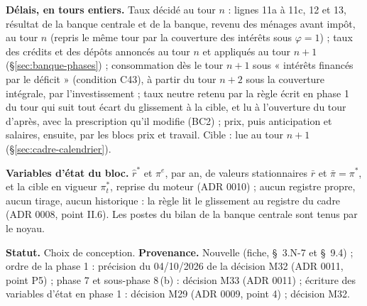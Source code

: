 \documentclass[11pt,a4paper]{article}
\begin{document}
\begin{proposee}
\textbf{Délais, en tours entiers.} Taux décidé au tour $n$ : lignes 11a à 11c, 12 et 13, résultat de la banque centrale et de la banque, revenu des ménages avant impôt, au tour $n$ (repris le même tour par la couverture des intérêts sous $\varphi = 1$) ; taux des crédits et des dépôts annoncés au tour $n$ et appliqués au tour $n + 1$ (\S\ref{sec:banque-phases}) ; consommation dès le tour $n + 1$ sous « intérêts financés par le déficit » (condition C43), à partir du tour $n + 2$ sous la couverture intégrale, par l'investissement ; taux neutre retenu par la règle écrit en phase 1 du tour qui suit tout écart du glissement à la cible, et lu à l'ouverture du tour d'après, avec la prescription qu'il modifie (BC2) ; prix, puis anticipation et salaires, ensuite, par les blocs prix et travail. Cible : lue au tour $n + 1$ (\S\ref{sec:cadre-calendrier}).

\textbf{Variables d'état du bloc.} $\hat r^\ast$ et $\pi^e$, par an, de valeurs stationnaires $\bar r$ et $\bar\pi = \pi^\ast$, et la cible en vigueur $\pi^\ast_t$, reprise du moteur (ADR 0010) ; aucun registre propre, aucun tirage, aucun historique : la règle lit le glissement au registre du cadre (ADR 0008, point II.6). Les postes du bilan de la banque centrale sont tenus par le noyau.

\textbf{Statut.} Choix de conception. \textbf{Provenance.} Nouvelle (fiche, \S~3.N-7 et \S~9.4) ; ordre de la phase 1 : précision du 04/10/2026 de la décision M32 (ADR 0011, point P5) ; phase 7 et sous-phase 8\,(b) : décision M33 (ADR 0011) ; écriture des variables d'état en phase 1 : décision M29 (ADR 0009, point 4) ; décision M32.
\end{proposee}
\end{document}
